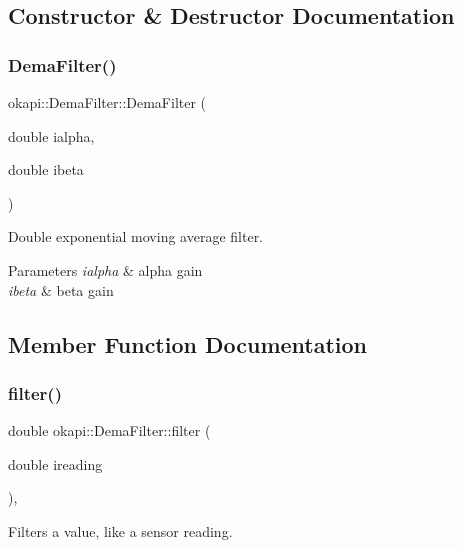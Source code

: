 \subsection{Constructor \& Destructor Documentation}
\mbox{\label{classokapi_1_1DemaFilter_ad5027a998ad5864b890c4aa04d6d54c3}} 
\subsubsection{\texorpdfstring{DemaFilter()}{DemaFilter()}}
{\footnotesize\ttfamily okapi\+::\+Dema\+Filter\+::\+Dema\+Filter (\begin{DoxyParamCaption}\item[{double}]{ialpha,  }\item[{double}]{ibeta }\end{DoxyParamCaption})}

Double exponential moving average filter.


\begin{DoxyParams}{Parameters}
{\em ialpha} & alpha gain \\
\hline
{\em ibeta} & beta gain \\
\hline
\end{DoxyParams}


\subsection{Member Function Documentation}
\mbox{\label{classokapi_1_1DemaFilter_a2d0eb2feae37ceacc865023ac4997ff1}} 
\subsubsection{\texorpdfstring{filter()}{filter()}}
{\footnotesize\ttfamily double okapi\+::\+Dema\+Filter\+::filter (\begin{DoxyParamCaption}\item[{double}]{ireading }\end{DoxyParamCaption})\hspace{0.3cm}{\ttfamily [override]}, {\ttfamily [virtual]}}

Filters a value, like a sensor reading.


